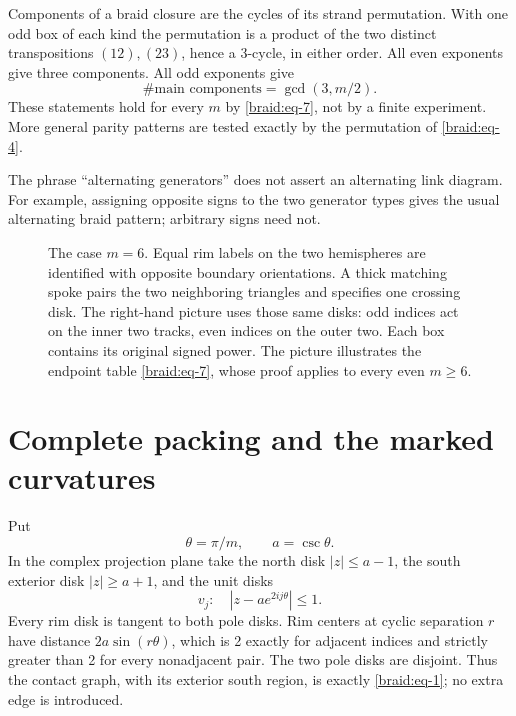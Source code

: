 \documentclass[11pt]{article}
\numberwithin{equation}{section}
\begin{document}
Components of a braid closure are the cycles of its strand permutation.
With one odd box of each kind the permutation is a product of the two
distinct transpositions \((12),(23)\), hence a 3-cycle, in either order.
All even exponents give three components. All odd exponents give \begin{equation}\label{braid:eq-8}
\#\text{main components}=\gcd(3,m/2).
\end{equation} These statements hold for every \(m\) by \eqref{braid:eq-7}, not by a finite
experiment. More general parity patterns are tested exactly by the
permutation of \eqref{braid:eq-4}.

The phrase ``alternating generators'' does not assert an alternating
link diagram. For example, assigning opposite signs to the two generator
types gives the usual alternating braid pattern; arbitrary signs need
not.


\begin{figure}[htbp]
\centering
\resizebox{\textwidth}{!}{}
\caption{The case \(m=6\). Equal rim labels on the two hemispheres are
identified with opposite boundary orientations. A thick matching spoke
pairs the two neighboring triangles and specifies one crossing disk.
The right-hand picture uses those same disks: odd indices act on the
inner two tracks, even indices on the outer two. Each box contains its
original signed power. The picture illustrates the endpoint table
\eqref{braid:eq-7}, whose proof applies to every even \(m\ge6\).}
\label{fig:matching}
\end{figure}

\section{Complete packing and the marked
curvatures}\label{braid:sec-3}

Put \begin{equation}\label{braid:eq-9}
\theta=\pi/m,\qquad a=\csc\theta.
\end{equation} In the complex projection plane take the north disk \(|z|\le a-1\),
the south exterior disk \(|z|\ge a+1\), and the unit disks \begin{equation}\label{braid:eq-10}
v_j:\quad |z-ae^{2ij\theta}|\le1.
\end{equation} Every rim disk is tangent to both pole disks. Rim centers at cyclic
separation \(r\) have distance \(2a\sin(r\theta)\), which is 2 exactly
for adjacent indices and strictly greater than 2 for every nonadjacent
pair. The two pole disks are disjoint. Thus the contact graph, with its
exterior south region, is exactly \eqref{braid:eq-1}; no extra edge is introduced.
\end{document}
